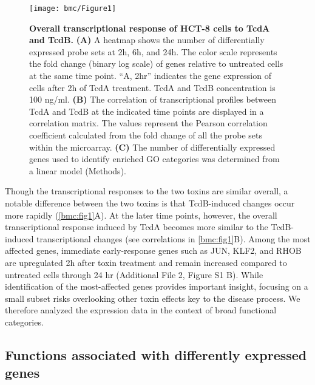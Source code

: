 \begin{figure}[h!]
  \centering
  \texttt{[image: bmc/Figure1]}
  \caption[Overall transcriptional response of HCT-8 cells to TcdA and TcdB]{
       \textbf{Overall transcriptional response of HCT-8 cells to TcdA and TcdB.}
       \textbf{(A)} A heatmap shows the number of differentially expressed probe sets at 2h, 6h, and 24h. The color scale represents the fold change (binary log scale) of genes relative to untreated cells at the same time point. “A, 2hr” indicates the gene expression of cells after 2h of TcdA treatment. TcdA and TcdB concentration is 100 ng/ml.
       \textbf{(B)} The correlation of transcriptional profiles between TcdA and TcdB at the indicated time points are displayed in a correlation matrix. The values represent the Pearson correlation coefficient calculated from the fold change of all the probe sets within the microarray.
       \textbf{(C)} The number of differentially expressed genes used to identify enriched GO categories was determined from a linear model (Methods).
}
  \label{bmc:fig1}
\end{figure}

Though the transcriptional responses to the two toxins are similar overall, a notable difference between the two toxins is that TcdB-induced changes occur more rapidly (\autoref{bmc:fig1}A). At the later time points, however, the overall transcriptional response induced by TcdA becomes more similar to the TcdB-induced transcriptional changes (see correlations in \autoref{bmc:fig1}B). Among the most affected genes, immediate early-response genes such as JUN, KLF2, and RHOB are upregulated 2h after toxin treatment and remain increased compared to untreated cells through 24 hr (Additional File 2, Figure S1 B). While identification of the most-affected genes provides important insight, focusing on a small subset risks overlooking other toxin effects key to the disease process. We therefore analyzed the expression data in the context of broad functional categories.

\subsection{Functions associated with differently expressed genes}

